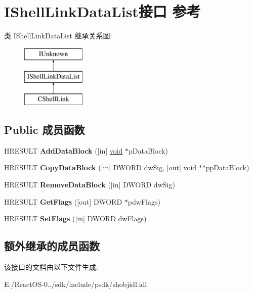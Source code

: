 \hypertarget{interface_i_shell_link_data_list}{}\section{I\+Shell\+Link\+Data\+List接口 参考}
\label{interface_i_shell_link_data_list}
类 I\+Shell\+Link\+Data\+List 继承关系图\+:\begin{figure}[H]
\begin{center}
\leavevmode
\includegraphics[height=3.000000cm]{interface_i_shell_link_data_list}
\end{center}
\end{figure}
\subsection*{Public 成员函数}
\begin{DoxyCompactItemize}
\item 
\mbox{\label{interface_i_shell_link_data_list_ace6e9849a391eb68470c858a91ff7db2}} 
H\+R\+E\+S\+U\+LT {\bfseries Add\+Data\+Block} (\mbox{[}in\mbox{]} \hyperlink{interfacevoid}{void} $\ast$p\+Data\+Block)
\item 
\mbox{\label{interface_i_shell_link_data_list_a92f12716af7be6c2ef6e7fae7ebe3e77}} 
H\+R\+E\+S\+U\+LT {\bfseries Copy\+Data\+Block} (\mbox{[}in\mbox{]} D\+W\+O\+RD dw\+Sig, \mbox{[}out\mbox{]} \hyperlink{interfacevoid}{void} $\ast$$\ast$pp\+Data\+Block)
\item 
\mbox{\label{interface_i_shell_link_data_list_a0826f722a33a3fb07695611852aaf886}} 
H\+R\+E\+S\+U\+LT {\bfseries Remove\+Data\+Block} (\mbox{[}in\mbox{]} D\+W\+O\+RD dw\+Sig)
\item 
\mbox{\label{interface_i_shell_link_data_list_acaa885ea213f9f71c2227d4af19a1400}} 
H\+R\+E\+S\+U\+LT {\bfseries Get\+Flags} (\mbox{[}out\mbox{]} D\+W\+O\+RD $\ast$pdw\+Flags)
\item 
\mbox{\label{interface_i_shell_link_data_list_ae3cd9476535308fd4a5825a47196a087}} 
H\+R\+E\+S\+U\+LT {\bfseries Set\+Flags} (\mbox{[}in\mbox{]} D\+W\+O\+RD dw\+Flags)
\end{DoxyCompactItemize}
\subsection*{额外继承的成员函数}


该接口的文档由以下文件生成\+:\begin{DoxyCompactItemize}
\item 
E\+:/\+React\+O\+S-\/0../sdk/include/psdk/shobjidl.\+idl\end{DoxyCompactItemize}
